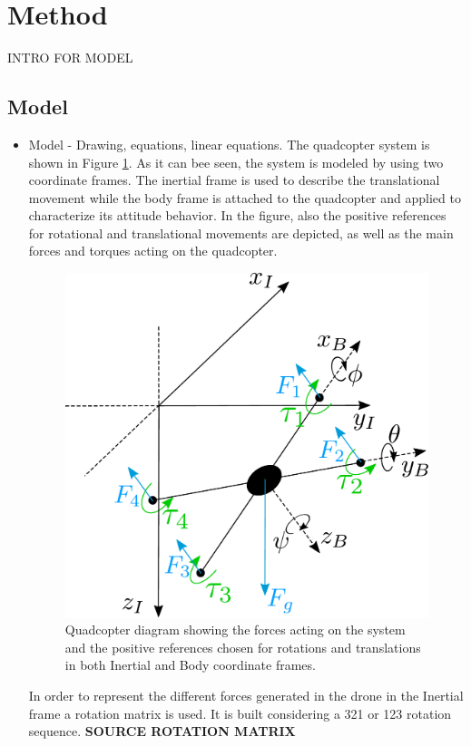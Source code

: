 \section{Method}
INTRO FOR MODEL
\subsection{Model}
\begin{itemize}
\item Model - Drawing, equations, linear equations.
The quadcopter system is shown in Figure \ref{droneDiagram}. As it can bee seen, the system is modeled by using two coordinate frames. The inertial frame is used to describe the translational movement while the body frame is attached to the quadcopter and applied to characterize its attitude behavior. In the figure, also the positive references for rotational and translational movements are depicted, as well as the main forces and torques acting on the quadcopter. 
\begin{figure}[H]
	\centering
	\includegraphics[scale=0.3]{droneDiagram}
	\caption{Quadcopter diagram showing the forces acting on the system and the positive references chosen for rotations and translations in both Inertial and Body coordinate frames.}
	\label{droneDiagram}
\end{figure}
In order to represent the different forces generated in the drone in the Inertial frame a rotation matrix is used. It is built considering a 321 or 123 rotation sequence. \textbf{SOURCE ROTATION  MATRIX} 

\end{itemize}
